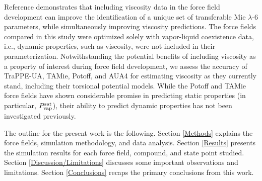 \documentclass[preprint,review,12pt]{elsarticle}
\begin{document}
        
	Reference  demonstrates that including viscosity data in the force field development can improve the identification of a unique set of transferable Mie $\lambda$-6 parameters, while simultaneously improving viscosity predictions. The force fields compared in this study were optimized solely with vapor-liquid coexistence data, i.e., dynamic properties, such as viscosity, were not included in their parameterization. Notwithstanding the potential benefits of including viscosity as a property of interest during force field development, we assess the accuracy of TraPPE-UA, TAMie, Potoff, and AUA4 for estimating viscosity as they currently stand, including their torsional potential models. While the Potoff and TAMie force fields have shown considerable promise in predicting static properties (in particular, $P_{\rm vap}^{\rm sat}$), their ability to predict dynamic properties has not been investigated previously. 
        
    
    The outline for the present work is the following. Section \ref{Methods} explains the force fields, simulation methodology, and data analysis. Section \ref{Results} presents the simulation results for each force field, compound, and state point studied. Section \ref{Discussion/Limitations} discusses some important observations and limitations. Section \ref{Conclusions} recaps the primary conclusions from this work.
    
\end{document}
